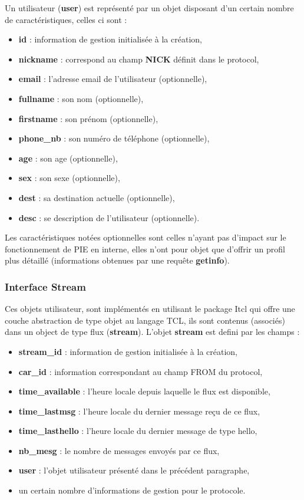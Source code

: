 Un utilisateur (\textbf{user}) est représenté par un objet disposant
d'un certain nombre de caractéristiques, celles ci sont : \\

\begin{itemize}
	\item \textbf{id} : information de gestion initialisée à la création,
	\item \textbf{nickname}	: correspond au champ \textbf{NICK} définit dans le protocol,
	\item \textbf{email} : l'adresse email de l'utilisateur (optionnelle),
	\item \textbf{fullname} : son nom (optionnelle),
	\item \textbf{firstname} : son prénom (optionnelle),
	\item \textbf{phone\_nb} : son numéro de téléphone (optionnelle),
	\item \textbf{age} : son age (optionnelle),
	\item \textbf{sex} : son sexe (optionnelle),
	\item \textbf{dest} : sa destination actuelle (optionnelle),
	\item \textbf{desc} : se description de l'utilisateur (optionnelle).\\
\end{itemize}

Les caractéristiques notées optionnelles sont celles n'ayant pas d'impact
sur le fonctionnement de PIE en interne, elles n'ont pour objet que d'offrir
un profil plus détaillé (informations obtenues par une requête \textbf{getinfo}).
 
\subsubsection{Interface Stream}

Ces objets utilisateur, sont implémentés en utilisant le package Itcl qui offre
une couche abstraction de type objet au langage TCL, ils sont contenus
(associés) dans un object de type flux (\textbf{stream}). L'objet \textbf{stream}
est defini par les champs : \\

\begin{itemize}
	\item \textbf{stream\_id} : information de gestion initialisée à la création,
	\item \textbf{car\_id} : information correspondant au champ FROM du protocol,
	\item \textbf{time\_available} : l'heure locale depuis laquelle le flux est disponible,
	\item \textbf{time\_lastmsg} : l'heure locale du dernier message reçu de ce flux,
	\item \textbf{time\_lasthello} : l'heure locale du dernier message de type hello,
	\item \textbf{nb\_mesg} : le nombre de messages envoyés par ce flux,
	\item \textbf{user} : l'objet utilisateur présenté dans le précédent paragraphe,
	\item un certain nombre d'informations de gestion pour le protocole.
\end{itemize}

